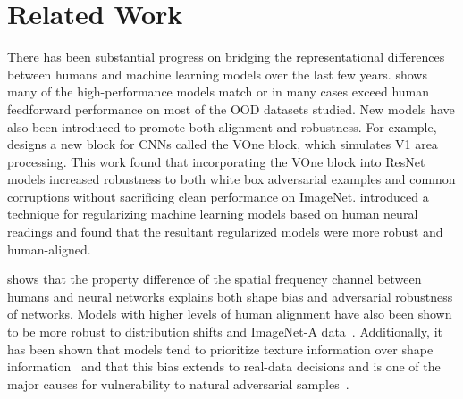 \section{Related Work}\label{sec:related}
There has been substantial progress on bridging the representational differences between humans and machine learning models over the last few years. \cite{geirhos_partial_2021} shows many of the high-performance models match or in many cases exceed human feedforward performance on most of the OOD datasets studied. New models have also been introduced to promote both alignment and robustness. For example, \cite{dapello_simulating_2020} designs a new block for CNNs called the VOne block, which simulates V1 area processing. This work found that incorporating the VOne block into ResNet models increased robustness to both white box adversarial examples and common corruptions without sacrificing clean performance on ImageNet. \cite{li_learning_2019} introduced a technique for regularizing machine learning models based on human neural readings and found that the resultant regularized models were more robust and human-aligned.


\cite{subramanian_spatial-frequency_2023} shows that the property difference of the spatial frequency channel between humans and neural networks explains both shape bias and adversarial robustness of networks. 
Models with higher levels of human alignment have also been shown to be more robust to distribution shifts and ImageNet-A data~\cite{sucholutsky_alignment_2023}. Additionally, it has been shown that models tend to prioritize texture information over shape information~\cite{geirhos_imagenet-trained_2019, hermann_origins_2020} and that this bias extends to real-data decisions and is one of the major causes for vulnerability to natural adversarial samples~\cite{hoak_err_2024, hoak_explorations_2024}.
